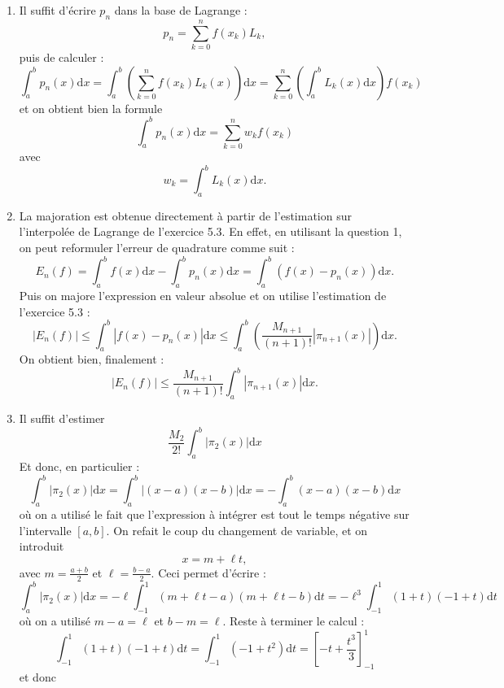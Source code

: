\documentclass{article}
\begin{document}
\begin{enumerate}
    \item Il suffit d'écrire $p_n$ dans la base de Lagrange :
    \[
    p_n = \sum_{k=0}^n f(x_k) L_k,
    \]
    puis de calculer :
    \[
        \int_a^b p_n(x) \mathrm{d}x = 
        \int_a^b \left ( \sum_{k=0}^n f(x_k) L_k(x) \right ) \mathrm{d}x =
        \sum_{k=0}^n \left ( \int_a^b L_k(x) \mathrm{d}x \right ) f(x_k) 
    \]
    et on obtient bien la formule
    \[
    \int_a^b p_n(x) \mathrm{d}x =
    \sum_{k=0}^n w_k f(x_k)
    \]
    avec
    \[
    w_k = \int_a^b L_k(x) \mathrm{d}x.
    \]
    \item La majoration est obtenue directement à partir de l'estimation sur l'inter\-polée de Lagrange de l'exercice 5.3.
    En effet, en utilisant la question 1, on peut reformuler l'erreur de quadrature comme suit :
    \[
    E_n (f) = \int_a^b f(x) \mathrm{d}x - \int_a^b p_n(x) \mathrm{d}x
    = \int_a^b (f(x) - p_n(x)) \mathrm{d}x.
    \]
    Puis on majore l'expression en valeur absolue et on utilise l'estimation de l'exercice 5.3 :
    \[
    | E_n (f) | %
    \leq \int_a^b |f(x) - p_n(x)| \mathrm{d}x
    \leq \int_a^b \left ( \frac{M_{n+1}}{(n+1)!} | \pi_{n+1}(x) | \right ) \mathrm{d}x.
    \]
    On obtient bien, finalement :
    \[
    | E_n (f) | %
    \leq \frac{M_{n+1}}{(n+1)!} \int_a^b  | \pi_{n+1}(x) | \mathrm{d}x.
    \]
    \item Il suffit d'estimer
    \[
    \frac{M_2}{2!} \int_a^b | \pi_2(x) | \mathrm{d}x
    \]
    Et donc, en particulier :
    \[
    \int_a^b | \pi_2(x) | \mathrm{d}x
    = \int_a^b | ( x - a ) ( x - b) | \mathrm{d}x
    = - \int_a^b ( x - a ) ( x - b) \mathrm{d}x
    \]
    où on a utilisé le fait que l'expression à intégrer est tout le temps négative sur l'intervalle $[a,b]$.
    On refait le coup du changement de variable, et on introduit 
    \[
    x = m + \ell t,
    \]
    avec $m=\frac{a+b}{2}$ et $\ell=\frac{b-a}{2}$.
    Ceci permet d'écrire :
    \[
    \int_a^b | \pi_2(x) | \mathrm{d}x
    = - \ell \int_{-1}^1 ( m + \ell t - a ) ( m + \ell t - b) \mathrm{d}t
     = - \ell^3 \int_{-1}^1 ( 1 + t ) ( -1 +  t ) \mathrm{d}t
    \]
    où on a utilisé $m-a=\ell$ et $b-m=\ell$. Reste à terminer le calcul :
    \[
    \int_{-1}^1 ( 1 + t ) ( -1 +  t ) \mathrm{d}t
    =
     \int_{-1}^1 ( -1 + t^2 ) \mathrm{d}t
    = 
     \left [ -t + \frac{t^3}{3}\right ]_{-1}^1
    \]
    et donc

\end{enumerate}
\end{document}
